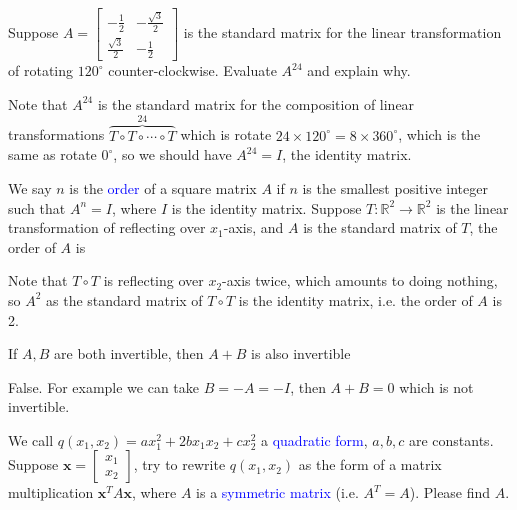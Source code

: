 \documentclass[a4paper,10pt]{article}
\begin{document}
\begin{problem}
Suppose $A=\begin{bmatrix}
-\frac{1}{2}&-\frac{\sqrt{3}}{2}\\\frac{\sqrt{3}}{2}&-\frac{1}{2}
\end{bmatrix}$ is the standard matrix for the linear transformation of rotating $120^\circ$ counter-clockwise. Evaluate $A^{24}$ and explain why.
\end{problem}

\begin{solution}
Note that $A^{24}$ is the standard matrix for the composition of linear transformations $\overbrace{T\circ T\circ\cdots\circ T}^{24}$ which is rotate $24\times120^\circ=8\times 360^\circ$, which is the same as rotate $0^\circ$, so we should have $A^{24}=I$, the identity matrix.
\end{solution}

\begin{problem}
We say $n$ is the \textcolor{blue}{order} of a square matrix $A$ if $n$ is the smallest positive integer such that $A^n=I$, where $I$ is the identity matrix. Suppose $T:\mathbb R^2\to\mathbb R^2$ is the linear transformation of reflecting over $x_1$-axis, and $A$ is the standard matrix of $T$, the order of $A$ is
\end{problem}

\begin{solution}
Note that $T\circ T$ is reflecting over $x_2$-axis twice, which amounts to doing nothing, so $A^2$ as the standard matrix of $T\circ T$ is the identity matrix, i.e. the order of $A$ is 2.
\end{solution}

\begin{problem}
If $A,B$ are both invertible, then $A+B$ is also invertible
\end{problem}

\begin{solution}
False. For example we can take $B=-A=-I$, then $A+B=0$ which is not invertible.
\end{solution}

\begin{problem}
We call $q(x_1,x_2)=ax_1^2+2bx_1x_2+cx_2^2$ a \textcolor{blue}{quadratic form}, $a,b,c$ are constants. Suppose $\mathbf x=\begin{bmatrix}x_1\\x_2\end{bmatrix}$, try to rewrite $q(x_1,x_2)$ as the form of a matrix multiplication $\mathbf x^TA\mathbf x$, where $A$ is a \textcolor{blue}{symmetric matrix} (i.e. $A^T=A$). Please find $A$.
\end{problem}
\end{document}
